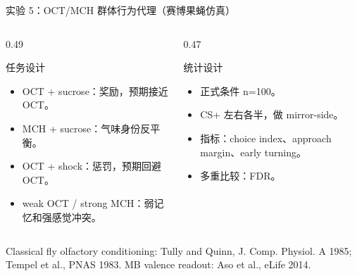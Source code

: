 \documentclass[aspectratio=169,10pt,fontset=none]{ctexbeamer}
\newcommand{\refs}[1]{\vfill{\tiny\textcolor{FlyDark}{#1}}}
\begin{document}
\begin{frame}{实验 5：OCT/MCH 群体行为代理（赛博果蝇仿真）}
\small
\begin{columns}[T,onlytextwidth]
  \begin{column}{0.49\textwidth}
    \begin{block}{任务设计}
      \begin{itemize}
        \item OCT + sucrose：奖励，预期接近 OCT。
        \item MCH + sucrose：气味身份反平衡。
        \item OCT + shock：惩罚，预期回避 OCT。
        \item weak OCT / strong MCH：弱记忆和强感觉冲突。
      \end{itemize}
    \end{block}
  \end{column}
  \begin{column}{0.47\textwidth}
    \begin{block}{统计设计}
      \begin{itemize}
        \item 正式条件 n=100。
        \item CS+ 左右各半，做 mirror-side。
        \item 指标：choice index、approach margin、early turning。
        \item 多重比较：FDR。
      \end{itemize}
    \end{block}
  \end{column}
\end{columns}
\refs{Classical fly olfactory conditioning: Tully and Quinn, J. Comp. Physiol. A 1985; Tempel et al., PNAS 1983. MB valence readout: Aso et al., eLife 2014.}
\end{frame}
\end{document}
